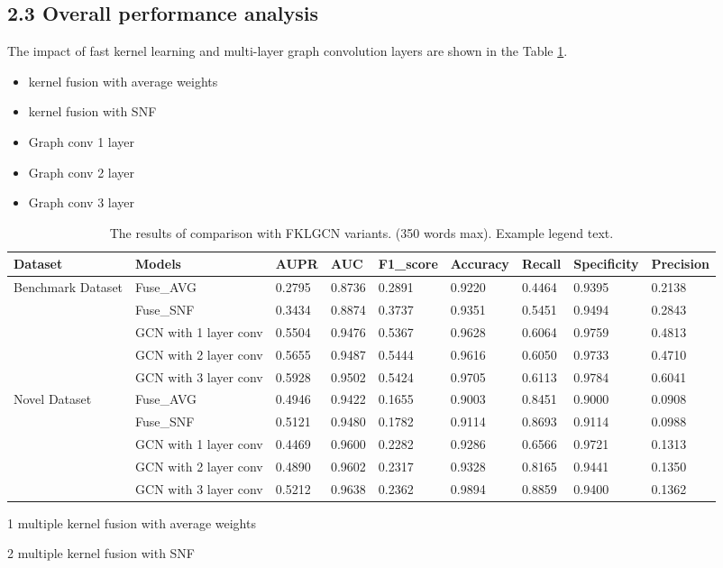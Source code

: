 \documentclass[fleqn,10pt]{wlscirep}
\begin{document}
\subsection*{2.3 Overall performance analysis}
The impact of fast kernel learning and multi-layer graph convolution layers are shown in the Table \ref{tab:parameter1}.
\begin{itemize}
\item kernel fusion with average weights
\item kernel fusion with SNF
\item Graph conv 1 layer
\item Graph conv 2 layer
\item Graph conv 3 layer
\end{itemize}
\begin{table}[ht]
\centering
 \caption{\label{tab:parameter1}The results of comparison with FKLGCN variants. (350 words max). Example legend text.}
\begin{threeparttable}[b]
\begin{tabular}{|l|l|l|l|l|l|l|l|l|}
\hline
Dataset & Models & AUPR & AUC &	F1_score & Accuracy	& Recall & Specificity & Precision\\
\hline
\multirow{4}{6em}{Benchmark Dataset} 
& Fuse_AVG\tnote{1} & 0.2795 & 0.8736 & 0.2891 & 0.9220 & 0.4464 & 0.9395 & 0.2138\\
& Fuse_SNF\tnote{2} & 0.3434	& 0.8874 & 0.3737	& 0.9351 & 0.5451	& 0.9494 & 0.2843\\
& GCN with 1 layer conv & 0.5504 & 0.9476 & 0.5367 & 0.9628 & 0.6064 & 0.9759 & 0.4813\\ 
& GCN with 2 layer conv & 0.5655 & 0.9487 & 0.5444 & 0.9616 & 0.6050 & 0.9733 & 0.4710\\
& GCN with 3 layer conv& 0.5928 & 0.9502 & 0.5424 & 0.9705 & 0.6113 & 0.9784 & 0.6041\\
\hline
\multirow{4}{6em}{Novel Dataset} 
& Fuse_AVG\tnote{1} & 0.4946 & 0.9422 & 0.1655 & 0.9003 & 0.8451 & 0.9000 & 0.0908\\
& Fuse_SNF\tnote{2} & 0.5121 & 0.9480 & 0.1782 & 0.9114 & 0.8693 & 0.9114	& 0.0988\\
& GCN with 1 layer conv & 0.4469 & 0.9600 & 0.2282 & 0.9286 & 0.6566 & 0.9721 & 0.1313\\ 
& GCN with 2 layer conv & 0.4890 & 0.9602 & 0.2317 & 0.9328 & 0.8165 & 0.9441 & 0.1350\\
& GCN with 3 layer conv & 0.5212 & 0.9638 & 0.2362 & 0.9894 & 0.8859 & 0.9400 & 0.1362\\
\hline
\end{tabular}
\begin{tablenotes}
     \item[1] multiple kernel fusion with average weights
     \item[2] multiple kernel fusion with SNF
     \end{tablenotes}
     \end{threeparttable}
\end{table}
\end{document}
